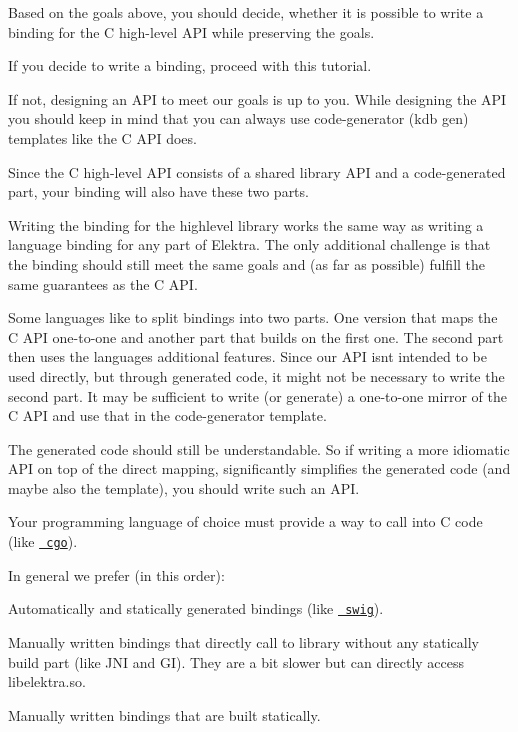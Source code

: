Based on the goals above, you should decide, whether it is possible to write a binding for the C high-\/level A\+PI while preserving the goals.

If you decide to write a binding, proceed with this tutorial.

If not, designing an A\+PI to meet our goals is up to you. While designing the A\+PI you should keep in mind that you can always use code-\/generator ({\ttfamily kdb gen}) templates like the C A\+PI does.

Since the C high-\/level A\+PI consists of a shared library A\+PI and a code-\/generated part, your binding will also have these two parts.

Writing the binding for the {\ttfamily highlevel} library works the same way as writing a language binding for any part of Elektra. The only additional challenge is that the binding should still meet the same goals and (as far as possible) fulfill the same guarantees as the C A\+PI.

Some languages like to split bindings into two parts. One version that maps the C A\+PI one-\/to-\/one and another part that builds on the first one. The second part then uses the languages additional features. Since our A\+PI isn\textquotesingle{}t intended to be used directly, but through generated code, it might not be necessary to write the second part. It may be sufficient to write (or generate) a one-\/to-\/one mirror of the C A\+PI and use that in the code-\/generator template.

The generated code should still be understandable. So if writing a more idiomatic A\+PI on top of the direct mapping, significantly simplifies the generated code (and maybe also the template), you should write such an A\+PI.

Your programming language of choice must provide a way to call into C code (like \href{https://golang.org/cmd/cgo/}{\texttt{ cgo}}).

In general we prefer (in this order)\+:


\begin{DoxyEnumerate}
\item Automatically and statically generated bindings (like \href{http://www.swig.org/}{\texttt{ swig}}).
\item Manually written bindings that directly call to library without any statically build part (like J\+NI and GI). They are a bit slower but can directly access libelektra.\+so.
\item Manually written bindings that are built statically.
\end{DoxyEnumerate}

